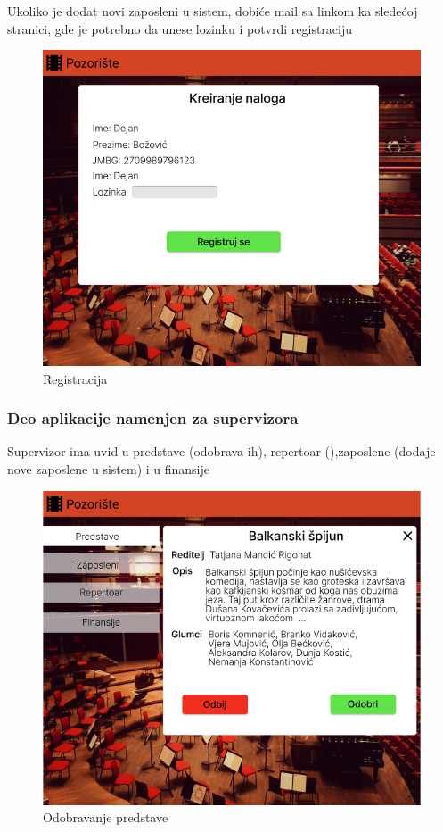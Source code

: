 \documentclass[a4paper]{article}
\begin{document}
Ukoliko je dodat novi zaposleni u sistem, dobiće mail sa linkom ka sledećoj stranici, gde je potrebno da unese lozinku i potvrdi registraciju

\begin{figure}[H]
  \begin{center}
    \includegraphics[width=130mm]{../images/zaposleni_prijavljivanje2.png}
  \end{center}
  \caption{Registracija}
  \label{zaposleni_prijavljivanje2}
\end{figure}
\subsubsection{Deo aplikacije namenjen za supervizora}
Supervizor ima uvid u predstave (odobrava ih), repertoar (),zaposlene (dodaje nove zaposlene u sistem) i u finansije


\begin{figure}[H]
  \begin{center}
    \includegraphics[width=130mm]{../images/supervizor_odobravanje_predstave.png}
  \end{center}
  \caption{Odobravanje predstave}
  \label{supervizor_odobravanje_predstave}
\end{figure}
\end{document}
